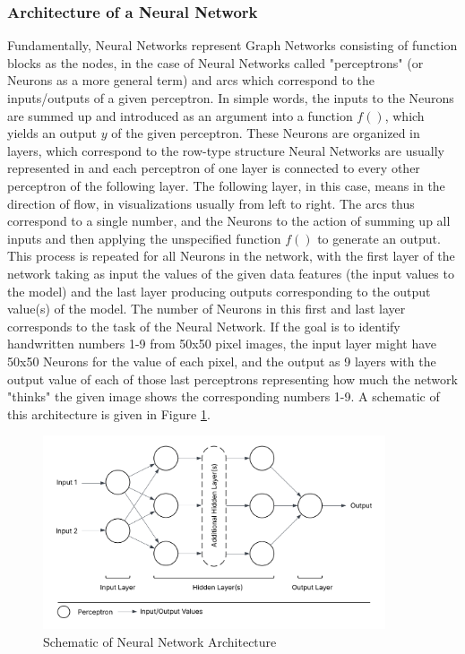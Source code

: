\documentclass[preprint,12pt]{elsarticle}
\begin{document}
\subsubsection{Architecture of a Neural Network}

Fundamentally, Neural Networks represent Graph Networks consisting of function blocks as the nodes, in the case of Neural Networks called "perceptrons" (or Neurons as a more general term) and arcs which correspond to the inputs/outputs of a given perceptron. In simple words, the inputs to the Neurons are summed up and introduced as an argument into a function $f()$, which yields an output $y$ of the given perceptron. These Neurons are organized in layers, which correspond to the row-type structure Neural Networks are usually represented in and each perceptron of one layer is connected to every other perceptron of the following layer. The following layer, in this case, means in the direction of flow, in visualizations usually from left to right. The arcs thus correspond to a single number, and the Neurons to the action of summing up all inputs and then applying the unspecified function $f()$ to generate an output. This process is repeated for all Neurons in the network, with the first layer of the network taking as input the values of the given data features (the input values to the model) and the last layer producing outputs corresponding to the output value(s) of the model. The number of Neurons in this first and last layer corresponds to the task of the Neural Network. If the goal is to identify handwritten numbers 1-9 from 50x50 pixel images, the input layer might have 50x50 Neurons for the value of each pixel, and the output as 9 layers with the output value of each of those last perceptrons representing how much the network "thinks" the given image shows the corresponding numbers 1-9. A schematic of this architecture is given in Figure \ref{fig:neural_network_architecture}.

\begin{figure}[h] 
	\centering
	\includegraphics[width=0.9\textwidth]{../figures/modelling/neural_network_concept.png} %
	\caption{Schematic of Neural Network Architecture}
	\label{fig:neural_network_architecture}
\end{figure}
\end{document}
